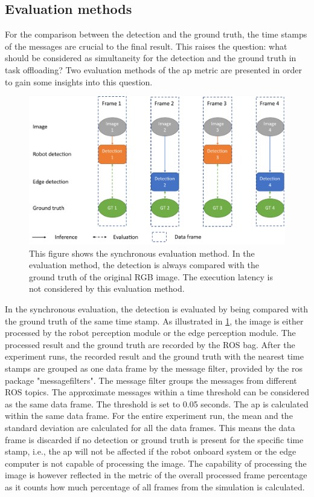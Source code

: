 \subsection{Evaluation methods}

For the comparison between the detection and the ground truth, the time stamps of the messages are crucial to the final result. This raises the question: what should be considered as simultaneity for the detection and the ground truth in task offloading? Two evaluation methods of the \gls{ap} metric are presented in order to gain some insights into this question. 

\begin{figure}[htp]
    \centering
    \includegraphics[width=\linewidth]{figures/setup/sync_eval.pdf}
    \caption[Synchronous evaluation]{This figure shows the synchronous evaluation method. In the evaluation method, the detection is always compared with the ground truth of the original RGB image. The execution latency is not considered by this evaluation method.}
    \label{fig:sync_eval}
\end{figure}

In the synchronous evaluation, the detection is evaluated by being compared with the ground truth of the same time stamp. As illustrated in \cref{fig:sync_eval}, the image is either processed by the robot perception module or the edge perception module. The processed result and the ground truth are recorded by the ROS bag. After the experiment runs, the recorded result and the ground truth with the nearest time stamps are grouped as one data frame by the message filter, provided by the \gls{ros} package "message\textunderscore filters". The message filter groups the messages from different ROS topics. The approximate messages within a time threshold can be considered as the same data frame. The threshold is set to 0.05 seconds. The \gls{ap} is calculated within the same data frame. For the entire experiment run, the mean and the standard deviation are calculated for all the data frames. This means the data frame is discarded if no detection or ground truth is present for the specific time stamp, i.e., the \gls{ap} will not be affected if the robot onboard system or the edge computer is not capable of processing the image. The capability of processing the image is however reflected in the metric of the overall processed frame percentage as it counts how much percentage of all frames from the simulation is calculated. 

